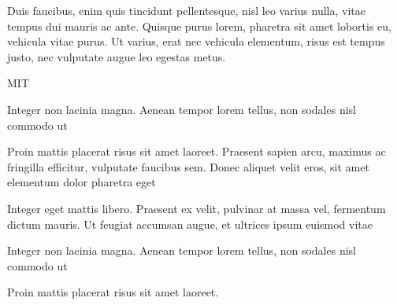 Duis faucibus, enim quis tincidunt pellentesque, nisl leo varius nulla, vitae tempus dui mauris ac ante. Quisque purus lorem, pharetra sit amet lobortis eu, vehicula vitae purus. Ut varius, erat nec vehicula elementum, risus est tempus justo, nec vulputate augue leo egestas metus.

\lipsum[14]

	\begin{table}[h!]	
		\centering
	\end{table}
	
	\acrlong{MIT}

\begin{alineascomponto}
	\item Integer non lacinia magna. Aenean tempor lorem tellus, non sodales nisl commodo ut
	\item Proin mattis placerat risus sit amet laoreet. Praesent sapien arcu, maximus ac fringilla efficitur, vulputate faucibus sem. Donec aliquet velit eros, sit amet elementum dolor pharetra eget
	\item Integer eget mattis libero. Praesent ex velit, pulvinar at massa vel, fermentum dictum mauris. Ut feugiat accumsan augue, et ultrices ipsum euismod vitae
	\begin{subalineascomponto}
		\item Integer non lacinia magna. Aenean tempor lorem tellus, non sodales nisl commodo ut
		\item Proin mattis placerat risus sit amet laoreet.
	\end{subalineascomponto}
\end{alineascomponto}